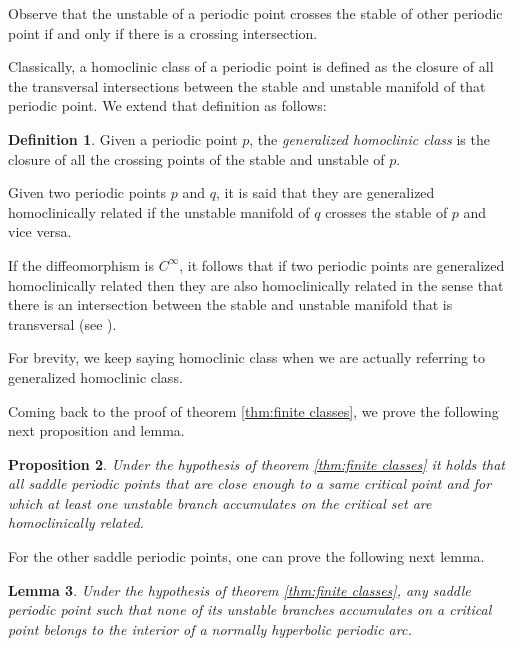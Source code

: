 \documentclass[a4paper,11pt]{article}
\newtheorem{lemma}{Lemma}
\newtheorem{proposition}[lemma]{Proposition}
\theoremstyle{definition}
\newtheorem{definition}[lemma]{Definition}
\begin{document}
Observe that the unstable of a periodic point crosses the stable of other periodic point if and only if  there is a crossing intersection.


Classically, a homoclinic class of a periodic point is defined as the closure of all the transversal intersections between the stable and unstable manifold of that periodic point. We extend that definition as follows:

\begin{definition}\label{defi:generalizedHC}
Given a periodic point $p$, the {\it generalized homoclinic class} is the closure of all the crossing points of the stable and unstable of $p.$

Given two periodic points $p$ and $q$, it is said that they are generalized homoclinically related if the unstable manifold of $q$ crosses the stable of $p$ and vice versa. 
    
\end{definition}

If the  diffeomorphism is $C^\infty$, it follows that if two periodic points are generalized homoclinically related then they are also homoclinically related in the sense that there is an intersection between the stable and unstable manifold that is transversal (see \cite{BCS}).



For brevity, we keep saying  homoclinic class when we are actually referring to generalized homoclinic class.




Coming back to the proof of theorem \ref{thm:finite classes}, we prove the following next proposition and lemma.


\begin{proposition}\label{critical-Misiu} 
Under the hypothesis of theorem \ref{thm:finite classes} it holds that all saddle periodic points that are close enough to a same critical point and for which at least one unstable branch accumulates on the critical set are homoclinically related.     
\end{proposition}


For the other  saddle periodic points, one can prove the following next lemma.


\begin{lemma}\label{critical-Misiu2} Under the hypothesis of theorem \ref{thm:finite classes}, any saddle periodic point such that none of its unstable branches accumulates on a critical point belongs to the interior of a normally hyperbolic periodic arc.
    
\end{lemma}
\end{document}
